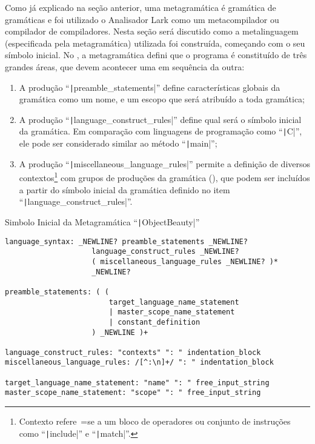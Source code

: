 Como já explicado na seção anterior,
uma metagramática é gramática de gramáticas e
foi utilizado o Analisador Lark como um metacompilador ou
compilador de compiladores.
Nesta seção será discutido como a metalinguagem (especificada pela metagramática) utilizada foi construída,
começando com o seu símbolo inicial.
No ,
a metagramática defini que o programa é constituído de três grandes áreas,
que devem acontecer uma em sequência da outra:
\begin{enumerate}
\item A produção ``\texttt|preamble_statements|'' define características globais da gramática como um nome,
e um escopo que será atribuído a toda gramática;
\item A produção ``\texttt|language_construct_rules|'' define qual será o símbolo inicial da gramática.
Em comparação com linguagens de programação como ``\texttt|C|'',
ele pode ser considerado similar ao método ``\texttt|main|'';
\item A produção ``\texttt|miscellaneous_language_rules|'' permite a definição de diversos contextos\footnote{
Contexto refere~=se a um bloco de operadores ou
conjunto de instruções como ``\texttt|include|'' e
``\texttt|match|''.
} com grupos de produções da gramática (),
que podem ser incluídos a partir do símbolo inicial da gramática definido no item ``\texttt|language_construct_rules|''.
\end{enumerate}%
\begin{code}
\caption[Simbolo Inicial da Metagramática ``ObjectBeauty'']{Simbolo Inicial da Metagramática ``\texttt|ObjectBeauty|''}
\label{code:simboloInicialDaMetagramatica}
\begin{verbatim}
language_syntax: _NEWLINE? preamble_statements _NEWLINE?
                    language_construct_rules _NEWLINE?
                    ( miscellaneous_language_rules _NEWLINE? )*
                    _NEWLINE?

preamble_statements: ( (
                        target_language_name_statement
                        | master_scope_name_statement
                        | constant_definition
                    ) _NEWLINE )+

language_construct_rules: "contexts" ": " indentation_block
miscellaneous_language_rules: /[^:\n]+/ ": " indentation_block

target_language_name_statement: "name" ": " free_input_string
master_scope_name_statement: "scope" ": " free_input_string
\end{verbatim}
\end{code}

